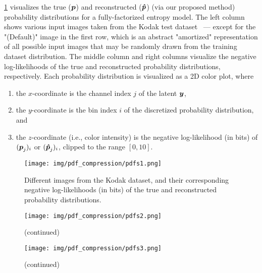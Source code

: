 \cref{fig:pdf/pdfs} visualizes the true (${\boldsymbol{p}}$) and reconstructed (${\boldsymbol{\hat{p}}}$) (via our proposed method) probability distributions for a fully-factorized entropy model.
The left column shows various input images taken from the Kodak test dataset~\cite{kodak_dataset} --- except for the "(Default)" image in the first row, which is an abstract "amortized" representation of all possible input images that may be randomly drawn from the training dataset distribution.
The middle column and right columns visualize the negative log-likelihoods of the true and reconstructed probability distributions, respectively.
Each probability distribution is visualized as a 2D color plot, where
\begin{enumerate}[label=(\roman*), noitemsep, topsep=0pt]
  \item the $x$-coordinate is the channel index $j$ of the latent ${\boldsymbol{y}}$,
  \item the $y$-coordinate is the bin index $i$ of the discretized probability distribution, and
  \item the $z$-coordinate (i.e., color intensity) is the negative log-likelihood (in bits) of $({\boldsymbol{p}}_j)_i$ or $({\boldsymbol{\hat{p}}}_j)_i$, clipped to the range $[0, 10]$.
\end{enumerate}


\begin{figure}[htbp]
  \centering
  \texttt{[image: img/pdf\_compression/pdfs1.png]}
  \caption[Visualization of target and reconstructed probability distributions]{%
    Different images from the Kodak dataset, and their corresponding negative log-likelihoods (in bits) of the true and reconstructed probability distributions.%
  }
  \label{fig:pdf/pdfs}
\end{figure}

\begin{figure}[htbp]
  \ContinuedFloat
  \centering
  \texttt{[image: img/pdf\_compression/pdfs2.png]}
  \caption[]{(continued)}
\end{figure}

\begin{figure}[htbp]
  \ContinuedFloat
  \centering
  \texttt{[image: img/pdf\_compression/pdfs3.png]}
  \caption[]{(continued)}
\end{figure}

